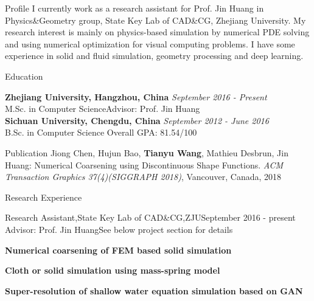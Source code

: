 \documentclass{resume} %
\begin{document}
\begin{rSection}{Profile}
I currently work as a research assistant for Prof. Jin Huang in Physics\&Geometry group, State Key Lab of CAD\&CG, Zhejiang University. My research interest is mainly on physics-based simulation by numerical PDE solving and using numerical optimization for visual computing problems. I have some experience in solid and fluid simulation, geometry processing and deep learning. 
\end{rSection}

\begin{rSection}{Education}

{\bf Zhejiang University, Hangzhou, China} \hfill {\em September 2016 - Present} 
\\ M.Sc. in Computer Science\hfill {Advisor: Prof. Jin Huang} 
\\{\bf Sichuan University, Chengdu, China} \hfill {\em September 2012 - June 2016} 
\\ B.Sc. in Computer Science\hfill { Overall GPA: 81.54/100 }

\end{rSection}

\begin{rSection}{Publication}
Jiong Chen, Hujun Bao, \textbf{Tianyu Wang}, Mathieu Desbrun, Jin Huang: Numerical Coarsening using Discontinuous Shape Functions. \emph{ACM Transaction Graphics 37(4)(SIGGRAPH 2018)}, Vancouver, Canada, 2018
\end{rSection}

\iffalse
\begin{rSection}{Work Experience}
\end{rSection}
\fi

\begin{rSection}{Research Experience}

  \begin{rSubsection}{Research Assistant,State Key Lab of CAD\&CG,ZJU}{September 2016 - present}
    {Advisor: Prof. Jin Huang}{See below project section for details}
\item {\bf Numerical coarsening of FEM based solid simulation}
\item {\bf Cloth or solid simulation using mass-spring model} 
\item {\bf Super-resolution of shallow water equation simulation based on GAN}
  \end{rSubsection}

\end{rSection}
\end{document}
